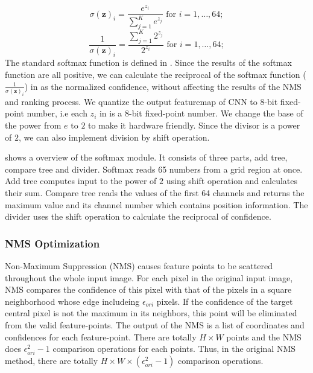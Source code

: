 \begin{equation}
    \sigma (\mathbf {z} )_{i}={\frac {e^{z_{i}}}{\sum _{j=1}^{K}e^{z_{j}}}}{\text{ for }}i=1,\dotsc ,64;
    \label{equ:softmax_o}
\end{equation}
\begin{equation}
    \frac{1}{\sigma (\mathbf {z} )_{i}}={\frac {\sum _{j=1}^{K}2^{z_{j}}}{2^{z_{i}}}}{\text{ for }}i=1,\dotsc ,64;
    \label{equ:softmax_hard}
\end{equation}
The standard softmax function is defined in .
Since the results of the softmax function are all positive, we can calculate the reciprocal of the softmax function ($\frac{1}{\sigma (\mathbf {z} )_{i}}$) in  as the normalized confidence, without affecting the results of the NMS and ranking process. We quantize the output featuremap of CNN to 8-bit fixed-point number, i.e each $z_i$ in  is a 8-bit fixed-point number. We change the base of the power from $e$ to $2$ to make it hardware friendly. Since the divisor is a power of $2$, we can also implement division by shift operation.

 shows a overview of the softmax module. It consists of three parts, add tree, compare tree and divider. Softmax reads 65 numbers from a grid region at once. Add tree computes input to the power of $2$ using shift operation and calculates their sum. Compare tree reads the values of the first 64 channels and returns the maximum value and its channel number which contains position information. The divider uses the shift operation to calculate the reciprocal of confidence.

\subsubsection{NMS Optimization}

Non-Maximum Suppression (NMS) causes feature points to be scattered throughout the whole input image. 
For each pixel in the original input image, NMS compares the confidence of this pixel with that of the pixels in a square neighborhood whose edge includeing $\epsilon _{ori}$ pixels. 
If the confidence of the target central pixel is not the maximum in its neighbors, this point will be eliminated from the valid feature-points. 
The output of the NMS is a list of coordinates and confidences for each feature-point. 
There are totally $H \times W$ points and the NMS does $\epsilon _{ori} ^ 2 - 1$ comparison operations for each points. 
Thus, in the original NMS method, there are totally $H \times W \times (\epsilon _{ori} ^ 2 - 1)$ comparison operations.

